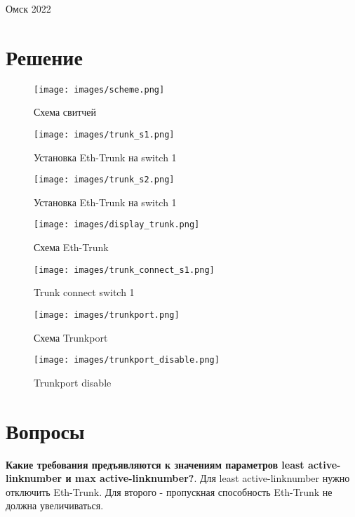 \documentclass[14pt, a4paper]{article}
\begin{document}
    \vspace*{\fill}
    \begin{center}
        Омск 2022
    \end{center}

    \newpage

    \section*{Решение}

    \begin{figure}[H]
        \centering
        \texttt{[image: images/scheme.png]}
        \caption{Схема свитчей}
    \end{figure}

    \begin{figure}[H]
        \centering
        \texttt{[image: images/trunk\_s1.png]}
        \caption{Установка Eth-Trunk на switch 1}
    \end{figure}

    \begin{figure}[H]
        \centering
        \texttt{[image: images/trunk\_s2.png]}
        \caption{Установка Eth-Trunk на switch 1}
    \end{figure}

    \begin{figure}[H]
        \centering
        \texttt{[image: images/display\_trunk.png]}
        \caption{Схема Eth-Trunk}
    \end{figure}

    \begin{figure}[H]
        \centering
        \texttt{[image: images/trunk\_connect\_s1.png]}
        \caption{Trunk connect switch 1}
    \end{figure}

    \begin{figure}[H]
        \centering
        \texttt{[image: images/trunkport.png]}
        \caption{Схема Trunkport}
    \end{figure}

    \begin{figure}[H]
        \centering
        \texttt{[image: images/trunkport\_disable.png]}
        \caption{Trunkport disable}
    \end{figure}

    \section*{Вопросы}
    
    \textbf{Какие требования предъявляются к значениям параметров least active-linknumber и max active-linknumber?}. Для least active-linknumber нужно отключить Eth-Trunk. Для второго - пропускная способность Eth-Trunk не должна увеличиваться.
\end{document}
